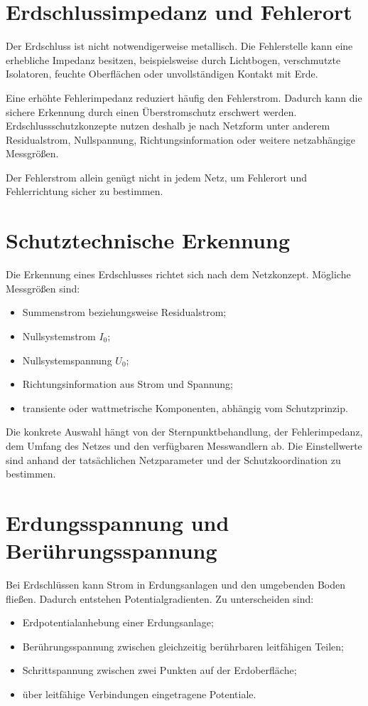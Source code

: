 \section{Erdschlussimpedanz und Fehlerort}

Der Erdschluss ist nicht notwendigerweise metallisch. Die Fehlerstelle
kann eine erhebliche Impedanz besitzen, beispielsweise durch Lichtbogen,
verschmutzte Isolatoren, feuchte Oberflächen oder unvollständigen Kontakt
mit Erde.

Eine erhöhte Fehlerimpedanz reduziert häufig den Fehlerstrom. Dadurch kann
die sichere Erkennung durch einen Überstromschutz erschwert werden.
Erdschlussschutzkonzepte nutzen deshalb je nach Netzform unter anderem
Residualstrom, Nullspannung, Richtungsinformation oder weitere
netzabhängige Messgrößen.

Der Fehlerstrom allein genügt nicht in jedem Netz, um Fehlerort und
Fehlerrichtung sicher zu bestimmen.

\section{Schutztechnische Erkennung}

Die Erkennung eines Erdschlusses richtet sich nach dem Netzkonzept.
Mögliche Messgrößen sind:
\begin{itemize}
  \item Summenstrom beziehungsweise Residualstrom;
  \item Nullsystemstrom \(I_0\);
  \item Nullsystemspannung \(U_0\);
  \item Richtungsinformation aus Strom und Spannung;
  \item transiente oder wattmetrische Komponenten, abhängig vom Schutzprinzip.
\end{itemize}

Die konkrete Auswahl hängt von der Sternpunktbehandlung, der Fehlerimpedanz,
dem Umfang des Netzes und den verfügbaren Messwandlern ab. Die
Einstellwerte sind anhand der tatsächlichen Netzparameter und der
Schutzkoordination zu bestimmen.

\section{Erdungsspannung und Berührungsspannung}

Bei Erdschlüssen kann Strom in Erdungsanlagen und den umgebenden Boden
fließen. Dadurch entstehen Potentialgradienten. Zu unterscheiden sind:
\begin{itemize}
  \item Erdpotentialanhebung einer Erdungsanlage;
  \item Berührungsspannung zwischen gleichzeitig berührbaren leitfähigen Teilen;
  \item Schrittspannung zwischen zwei Punkten auf der Erdoberfläche;
  \item über leitfähige Verbindungen eingetragene Potentiale.
\end{itemize}

